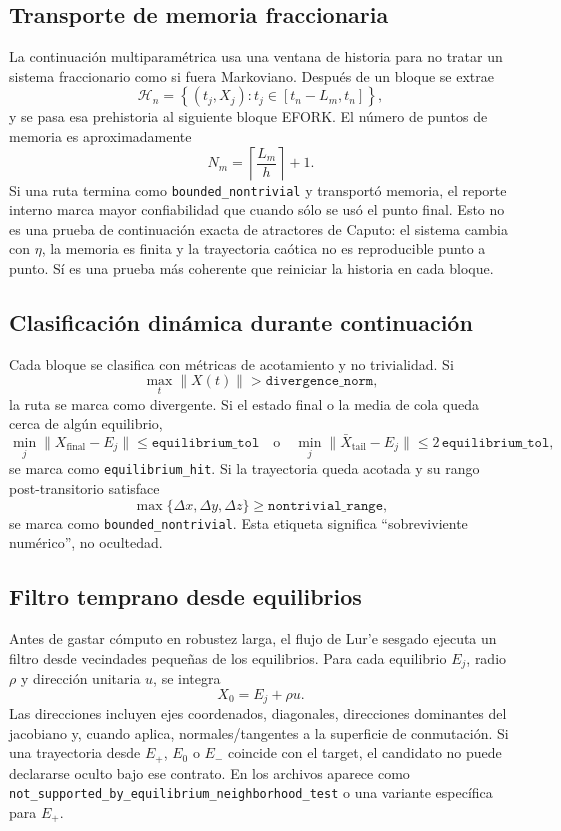 \documentclass[11pt]{article}
\begin{document}
\subsection{Transporte de memoria fraccionaria}

La continuación multiparamétrica usa una ventana de historia para no tratar
un sistema fraccionario como si fuera Markoviano. Después de un bloque se
extrae
\[
\mathcal{H}_n=
\left\{(t_j,X_j):t_j\in[t_n-L_m,t_n]\right\},
\]
y se pasa esa prehistoria al siguiente bloque EFORK. El número de puntos de
memoria es aproximadamente
\[
N_m=\left\lceil\frac{L_m}{h}\right\rceil+1.
\]
Si una ruta termina como \texttt{bounded\_nontrivial} y transportó memoria,
el reporte interno marca mayor confiabilidad que cuando sólo se usó el punto
final. Esto no es una prueba de continuación exacta de atractores de Caputo:
el sistema cambia con \(\eta\), la memoria es finita y la trayectoria caótica
no es reproducible punto a punto. Sí es una prueba más coherente que reiniciar
la historia en cada bloque.

\subsection{Clasificación dinámica durante continuación}

Cada bloque se clasifica con métricas de acotamiento y no trivialidad. Si
\[
\max_t\|X(t)\|>\texttt{divergence\_norm},
\]
la ruta se marca como divergente. Si el estado final o la media de cola queda
cerca de algún equilibrio,
\[
\min_j\|X_{\mathrm{final}}-E_j\|\leq\texttt{equilibrium\_tol}
\quad\text{o}\quad
\min_j\|\bar X_{\mathrm{tail}}-E_j\|\leq2\,\texttt{equilibrium\_tol},
\]
se marca como \texttt{equilibrium\_hit}. Si la trayectoria queda acotada y su
rango post-transitorio satisface
\[
\max\{\Delta x,\Delta y,\Delta z\}\geq
\texttt{nontrivial\_range},
\]
se marca como \texttt{bounded\_nontrivial}. Esta etiqueta significa
``sobreviviente numérico'', no ocultedad.

\subsection{Filtro temprano desde equilibrios}

Antes de gastar cómputo en robustez larga, el flujo de Lur'e sesgado ejecuta
un filtro desde vecindades pequeñas de los equilibrios. Para cada equilibrio
\(E_j\), radio \(\rho\) y dirección unitaria \(u\), se integra
\[
X_0=E_j+\rho u.
\]
Las direcciones incluyen ejes coordenados, diagonales, direcciones dominantes
del jacobiano y, cuando aplica, normales/tangentes a la superficie de
conmutación. Si una trayectoria desde \(E_+\), \(E_0\) o \(E_-\) coincide con
el target, el candidato no puede declararse oculto bajo ese contrato. En los
archivos aparece como
\texttt{not\_supported\_by\_equilibrium\_neighborhood\_test} o una variante
específica para \(E_+\).
\end{document}
